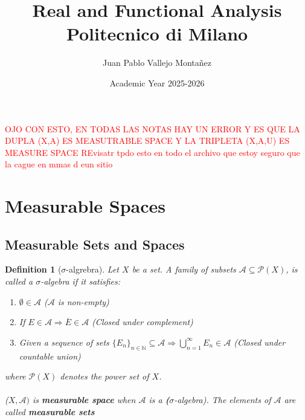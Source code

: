 \documentclass[10pt, oneside]{article}
\title{Real and Functional Analysis \\ \large Politecnico di Milano}
\author{Juan Pablo Vallejo Montañez}
\date{Academic Year 2025-2026}
\newenvironment{definitionbox}[1][]{\begin{defbox}\begin{defn}[#1]}{\end{defn}\end{defbox}}
\numberwithin{equation}{section}
\newtheorem{defn}{Definition}[section]
\begin{document}
\maketitle
\tableofcontents

\vspace{.25in}

\textcolor{red}{OJO CON ESTO, EN TODAS LAS NOTAS HAY UN ERROR Y ES QUE LA DUPLA (X,A) ES MEASUTRABLE SPACE Y LA TRIPLETA (X,A,U) ES MEASURE SPACE REvisatr tpdo esto en todo el archivo que estoy seguro que la cague en mmas d eun sitio }

\section{Measurable Spaces}
\subsection{Measurable Sets and Spaces}
\begin{definitionbox}[\(\sigma \)-algrebra]
Let \(X\) be a set. A family of subsets \(\mathcal{A} \subseteq \mathcal{P}(X)\), is called a \(\sigma\)-algebra if it satisfies:

\begin{center}
\begin{minipage}{0.8\textwidth}
\begin{enumerate}[label=(\roman*)]
    \item \(\emptyset \in \mathcal{A}\) (\(\mathcal{A}\) is non-empty)  
    \item If \(E \in \mathcal{A} \Rightarrow \overline{E} \in \mathcal{A}\) (Closed under complement)
    \item Given a sequence of sets 
    \(\{E_n\}_{n\in \mathbb{N}} \subseteq \mathcal{A} \Rightarrow 
    \displaystyle \bigcup_{n=1}^{\infty} E_n \in \mathcal{A}\) 
    (Closed under countable union)
\end{enumerate}
\end{minipage}
\end{center}

where \(\mathcal{P}(X)\) denotes the power set of \(X\).\\
\\
(\(X,\mathcal{A})\) is \textbf{measurable space} when \(\mathcal{A}\) is a \textbf(\(\sigma\)-algebra). The elements of \(\mathcal{A}\) are called \textbf{measurable sets}
\end{definitionbox}
\end{document}
